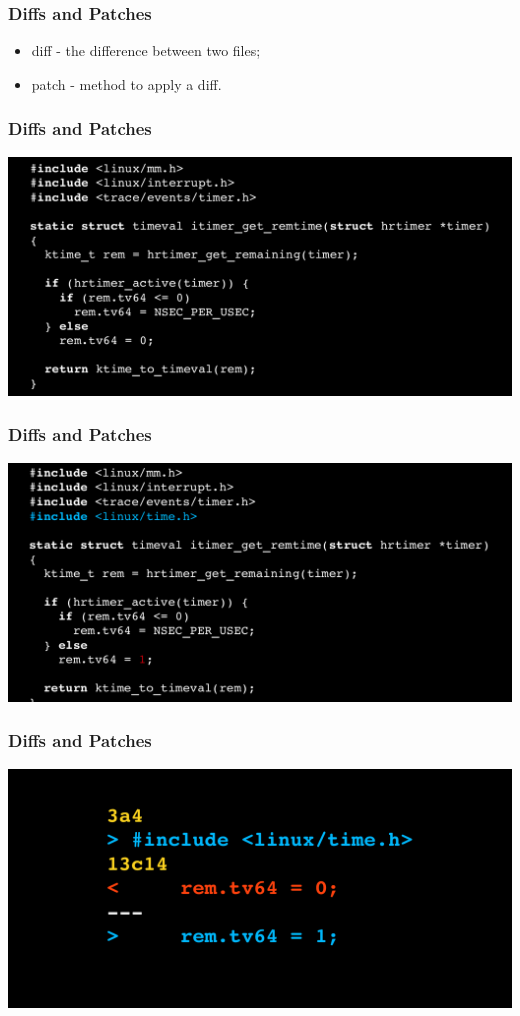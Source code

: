 \documentclass{beamer}
\begin{document}
\begin{frame}
\frametitle{Diffs and Patches}
\begin{itemize}
\item diff - the difference between two files;
\item patch - method to apply a diff.
\end{itemize}
\end{frame}

\begin{frame}
\frametitle{Diffs and Patches}
  \includegraphics[width=1\textwidth]{imgs/diff-01.png}
\end{frame}

\begin{frame}
\frametitle{Diffs and Patches}
  \includegraphics[width=1\textwidth]{imgs/diff-02.png}
\end{frame}

\begin{frame}
\frametitle{Diffs and Patches}
  \includegraphics[width=1\textwidth]{imgs/diff-03.png}
\end{frame}
\end{document}
